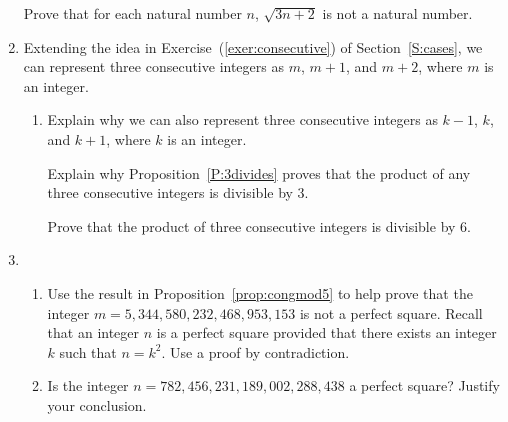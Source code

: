 \begin{enumerate}
\xitem Prove that for each natural number $n$, $\sqrt{3n + 2}$ is not a natural number.
\label{exer:notperfectsquare}%

\item Extending the idea in Exercise~(\ref{exer:consecutive}) of Section~\ref{S:cases}, we can represent three consecutive integers as  $m$, $m + 1$, and  $m + 2$,  where  $m$  is an integer. 
\label{exer:sec34-2}%
\begin{enumerate}
  \item Explain why we can also represent three consecutive integers as  $k - 1$, $k$, and 
$k + 1$,  where  $k$  is an integer.

  \yitem Explain why Proposition~\ref{P:3divides} proves that the product of any three consecutive integers is divisible by 3.

  \yitem Prove that the product of three consecutive integers is divisible by 6.
\end{enumerate}

%


\item \begin{enumerate} \label{exer:squaremod5}
%
\item Use the result in Proposition~\ref{prop:congmod5}  to help prove that the integer $m = 5,344, 580,232,468,953,153$ is not a perfect square.  Recall that an integer $n$ is a perfect square provided that there exists an integer $k$ such that $n = k^2$.  \hint Use a proof by contradiction.
\item Is the integer $n = 782,456,231,189,002,288, 438$ a perfect square?  Justify your conclusion.
\end{enumerate}



\end{enumerate}

